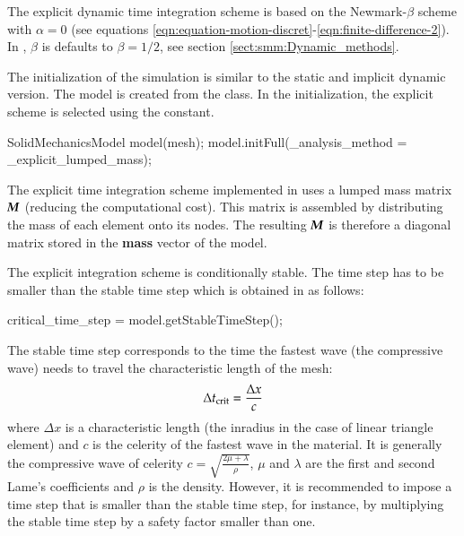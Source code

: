 The explicit dynamic time integration scheme is based on the
Newmark-$\beta$ scheme with $\alpha=0$ (see equations
\ref{eqn:equation-motion-discret}-\ref{eqn:finite-difference-2}).  In
\akantu, $\beta$ is defaults to $\beta=1/2$, see section
\ref{sect:smm:Dynamic_methods}.

The initialization of the simulation is similar to the static and
implicit dynamic version.  The model is created from the
 class.  In the initialization, the explicit
scheme is selected using the  constant.

\begin{cpp}
SolidMechanicsModel model(mesh);
model.initFull(_analysis_method = _explicit_lumped_mass);
\end{cpp}

The explicit time integration scheme implemented in \akantu uses a
lumped mass matrix $\boldsymbol{M}$ (reducing the computational cost). This
matrix is assembled by distributing the mass of each element onto its
nodes. The resulting $\boldsymbol{M}$ is therefore a diagonal matrix stored
in the \textbf{mass} vector of the model.

The explicit integration scheme is conditionally stable. The time step
has to be smaller than the stable time step which is obtained in
\akantu as follows:

\begin{cpp}
critical_time_step = model.getStableTimeStep();
\end{cpp} 

The stable time  step corresponds to the time the fastest wave (the compressive
wave) needs to travel the characteristic length of the mesh:
\begin{equation}
\label{eqn:smm:explicit:stabletime}
\Delta t_{{\mathrm{crit}}} = \frac{\Delta x}{c}
\end{equation}
where $\Delta x$ is a characteristic length (\eg the inradius in the case of
linear triangle element) and $c$ is the celerity of the fastest wave in the
material. It is generally the compressive wave of celerity
$c = \sqrt{\frac{2 \mu + \lambda}{\rho}}$, $\mu$ and $\lambda$ are the first and
second Lame's coefficients and $\rho$ is the density. However, it is recommended
to impose a time step that is smaller than the stable time step, for instance,
by multiplying the stable time step by a safety factor smaller than one.


